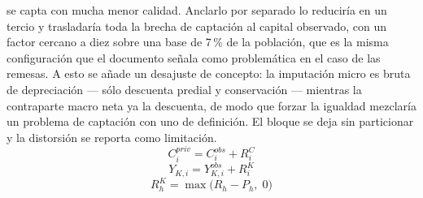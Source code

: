 \documentclass[11pt,a4paper]{article}
\begin{document}
se capta con mucha menor calidad. Anclarlo por separado lo reduciría en un tercio y trasladaría
toda la brecha de captación al capital observado, con un factor cercano a diez sobre una base de
7\,\% de la población, que es la misma configuración que el documento señala como problemática en
el caso de las remesas. A esto se añade un desajuste de concepto: la imputación micro es bruta de
depreciación --- sólo descuenta predial y conservación --- mientras la contraparte macro neta ya la
descuenta, de modo que forzar la igualdad mezclaría un problema de captación con uno de definición.
El bloque se deja sin particionar y la distorsión se reporta como limitación.
\begin{equation}
\label{eq:cpriv}
C^{priv}_i = C^{obs}_i + R^{C}_i
\end{equation}
\begin{equation}
\label{eq:ykalq}
Y_{K,i} = Y^{obs}_{K,i} + R^{K}_i
\end{equation}
\begin{equation}
\label{eq:alqneto}
R^{K}_h = \max\big(R_h - P_h,\; 0\big)
\end{equation}
\end{document}

